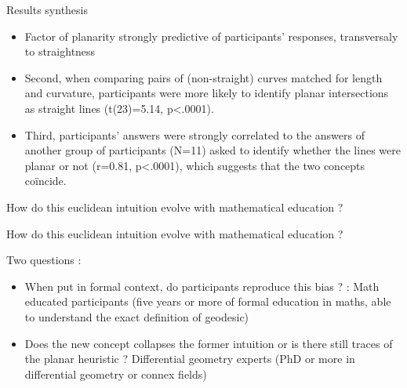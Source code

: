 \documentclass[11pt]{beamer}
\begin{document}
          

        \begin{frame}

          Results synthesis

          \begin{itemize}

          \item{Factor of planarity strongly predictive of participants’ responses, transversaly to straightness }

          \item{Second, when comparing pairs of (non-straight) curves matched for length and curvature, participants were more likely to identify planar intersections as straight lines (t(23)=5.14, p<.0001). }

          \item{Third, participants’ answers were strongly correlated to the answers of another group of participants (N=11) asked to identify whether the lines were planar or not (r=0.81, p<.0001), which suggests that the two concepts coïncide. }

          \end{itemize}
          
        \end{frame}

        \begin{frame}

          How do this euclidean intuition evolve with mathematical education ?

           
           \end{frame}


        \begin{frame}

          How do this euclidean intuition evolve with mathematical education ?

          Two questions : 


          \begin{itemize}

          \item{When put in formal context, do participants reproduce this bias ? : Math educated participants (five years or more of formal education in maths, able to understand the exact definition of geodesic)}

           

          \item{Does the new concept collapses the former intuition or is there still traces of the planar heuristic ? Differential geometry experts (PhD or more in differential geometry or connex fields)}


           
           

            \end{itemize}

        \end{frame}
\end{document}
